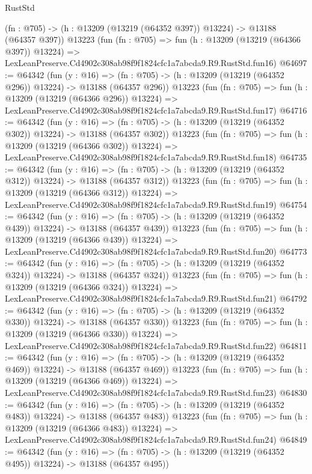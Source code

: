 \begin{lexlean}{RustStd}
\begin{coremodule}
    (fn : @705) -> (h : @13209 (@13219 (@64352 @397)) @13224) -> @13188 (@64357 @397))
    @13223
    (fun (fn : @705) =>
    fun (h : @13209 (@13219 (@64366 @397)) @13224) =>
    LexLeanPreserve.Cd4902c308ab98f9f1824cfc1a7abcda9.R9.RustStd.fun16)
@64697 := @64342
    (fun (y : @16) =>
    (fn : @705) -> (h : @13209 (@13219 (@64352 @296)) @13224) -> @13188 (@64357 @296))
    @13223
    (fun (fn : @705) =>
    fun (h : @13209 (@13219 (@64366 @296)) @13224) =>
    LexLeanPreserve.Cd4902c308ab98f9f1824cfc1a7abcda9.R9.RustStd.fun17)
@64716 := @64342
    (fun (y : @16) =>
    (fn : @705) -> (h : @13209 (@13219 (@64352 @302)) @13224) -> @13188 (@64357 @302))
    @13223
    (fun (fn : @705) =>
    fun (h : @13209 (@13219 (@64366 @302)) @13224) =>
    LexLeanPreserve.Cd4902c308ab98f9f1824cfc1a7abcda9.R9.RustStd.fun18)
@64735 := @64342
    (fun (y : @16) =>
    (fn : @705) -> (h : @13209 (@13219 (@64352 @312)) @13224) -> @13188 (@64357 @312))
    @13223
    (fun (fn : @705) =>
    fun (h : @13209 (@13219 (@64366 @312)) @13224) =>
    LexLeanPreserve.Cd4902c308ab98f9f1824cfc1a7abcda9.R9.RustStd.fun19)
@64754 := @64342
    (fun (y : @16) =>
    (fn : @705) -> (h : @13209 (@13219 (@64352 @439)) @13224) -> @13188 (@64357 @439))
    @13223
    (fun (fn : @705) =>
    fun (h : @13209 (@13219 (@64366 @439)) @13224) =>
    LexLeanPreserve.Cd4902c308ab98f9f1824cfc1a7abcda9.R9.RustStd.fun20)
@64773 := @64342
    (fun (y : @16) =>
    (fn : @705) -> (h : @13209 (@13219 (@64352 @324)) @13224) -> @13188 (@64357 @324))
    @13223
    (fun (fn : @705) =>
    fun (h : @13209 (@13219 (@64366 @324)) @13224) =>
    LexLeanPreserve.Cd4902c308ab98f9f1824cfc1a7abcda9.R9.RustStd.fun21)
@64792 := @64342
    (fun (y : @16) =>
    (fn : @705) -> (h : @13209 (@13219 (@64352 @330)) @13224) -> @13188 (@64357 @330))
    @13223
    (fun (fn : @705) =>
    fun (h : @13209 (@13219 (@64366 @330)) @13224) =>
    LexLeanPreserve.Cd4902c308ab98f9f1824cfc1a7abcda9.R9.RustStd.fun22)
@64811 := @64342
    (fun (y : @16) =>
    (fn : @705) -> (h : @13209 (@13219 (@64352 @469)) @13224) -> @13188 (@64357 @469))
    @13223
    (fun (fn : @705) =>
    fun (h : @13209 (@13219 (@64366 @469)) @13224) =>
    LexLeanPreserve.Cd4902c308ab98f9f1824cfc1a7abcda9.R9.RustStd.fun23)
@64830 := @64342
    (fun (y : @16) =>
    (fn : @705) -> (h : @13209 (@13219 (@64352 @483)) @13224) -> @13188 (@64357 @483))
    @13223
    (fun (fn : @705) =>
    fun (h : @13209 (@13219 (@64366 @483)) @13224) =>
    LexLeanPreserve.Cd4902c308ab98f9f1824cfc1a7abcda9.R9.RustStd.fun24)
@64849 := @64342
    (fun (y : @16) =>
    (fn : @705) -> (h : @13209 (@13219 (@64352 @495)) @13224) -> @13188 (@64357 @495))

\end{coremodule}
\end{lexlean}

